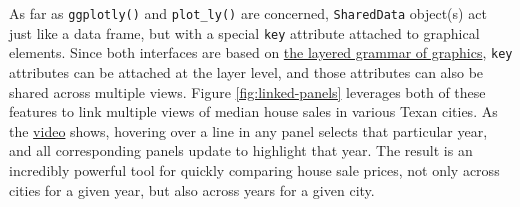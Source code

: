 \documentclass[12pt,]{isuthesis}
\newenvironment{Shaded}{\begin{snugshade}}{\end{snugshade}}
\newcommand{\KeywordTok}[1]{\textcolor[rgb]{0.13,0.29,0.53}{\textbf{{#1}}}}
\newcommand{\DataTypeTok}[1]{\textcolor[rgb]{0.13,0.29,0.53}{{#1}}}
\newcommand{\DecValTok}[1]{\textcolor[rgb]{0.00,0.00,0.81}{{#1}}}
\newcommand{\StringTok}[1]{\textcolor[rgb]{0.31,0.60,0.02}{{#1}}}
\newcommand{\CommentTok}[1]{\textcolor[rgb]{0.56,0.35,0.01}{\textit{{#1}}}}
\newcommand{\NormalTok}[1]{{#1}}
\begin{document}
\begin{Shaded}
\end{Shaded}

As far as \texttt{ggplotly()} and \texttt{plot\_ly()} are concerned,
\texttt{SharedData} object(s) act just like a data frame, but with a
special \texttt{key} attribute attached to graphical elements. Since
both interfaces are based on
\protect\hyperlink{the-layered-grammar-of-graphics}{the layered grammar
of graphics}, \texttt{key} attributes can be attached at the layer
level, and those attributes can also be shared across multiple views.
Figure \ref{fig:linked-panels} leverages both of these features to link
multiple views of median house sales in various Texan cities. As the
\href{http://i.imgur.com/DdPdSBB.gif}{video} shows, hovering over a line
in any panel selects that particular year, and all corresponding panels
update to highlight that year. The result is an incredibly powerful tool
for quickly comparing house sale prices, not only across cities for a
given year, but also across years for a given city.

\begin{Shaded}
\end{Shaded}
\end{document}
